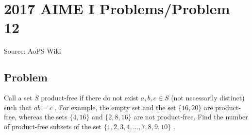 \documentclass[12pt]{article}
\begin{document}
\section*{{2017 AIME I Problems/Problem 12}}
Source: AoPS Wiki

\subsection*{Problem}
Call a set $S$ product-free if there do not exist $a, b, c \in S$ (not necessarily distinct) such that $a b = c$ . For example, the empty set and the set $\{16, 20\}$ are product-free, whereas the sets $\{4, 16\}$ and $\{2, 8, 16\}$ are not product-free. Find the number of product-free subsets of the set $\{1, 2, 3, 4,..., 7, 8, 9, 10\}$ .
\end{document}
